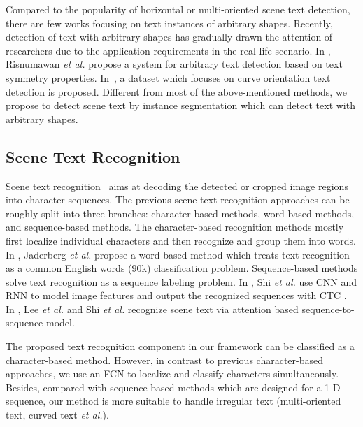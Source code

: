\documentclass[runningheads]{llncs}
\begin{document}
Compared to the popularity of horizontal or multi-oriented scene text detection, there are few works focusing on text instances of arbitrary shapes. 
Recently, detection of text with arbitrary shapes has gradually drawn the attention of researchers due to the application requirements in the real-life scenario. In \cite{risnumawan2014robust}, Risnumawan \emph{et al.} propose a system for arbitrary text detection based on text symmetry properties. In~\cite{CK2017}, a dataset which focuses on curve orientation text detection is proposed. Different from most of the above-mentioned methods, we propose to detect scene text by instance segmentation which can detect text with arbitrary shapes.


\subsection{Scene Text Recognition}

Scene text recognition~\cite{yao2014strokelets,shi2018aster} aims at decoding the detected or cropped image regions into character sequences. The previous scene text recognition approaches can be roughly split into three branches: character-based methods, word-based methods, and sequence-based methods. The character-based recognition methods \cite{bissacco2013photoocr,jaderberg2014deep} mostly first localize individual characters and then recognize and group them into words. In \cite{Jaderberg14c}, Jaderberg \emph{et al.} propose a word-based method which treats text recognition as a common English words (90k) classification problem. Sequence-based methods solve text recognition as a sequence labeling problem. In \cite{shi2017end}, Shi \emph{et al.} use CNN and RNN to model image features and output the recognized sequences with CTC \cite{graves2006connectionist}. In \cite{lee2016recursive,shi2016robust}, Lee \emph{et al.} and Shi \emph{et al.} recognize scene text via attention based sequence-to-sequence model.

The proposed text recognition component in our framework can be classified as a character-based method. However, in contrast to previous character-based approaches, we use an FCN \cite{long2015fully} to localize and classify characters simultaneously. Besides, compared with sequence-based methods which are designed for a 1-D sequence, our method is more suitable to handle irregular text (multi-oriented text, curved text \emph{et al.}).
\end{document}
